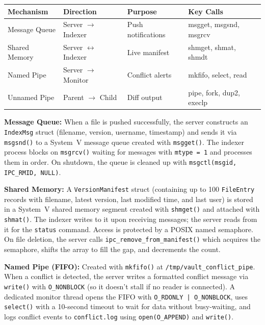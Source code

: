 \documentclass[12pt,a4paper]{article}
\begin{document}
\begin{table}[H]
\centering
\begin{tabular}{@{}llll@{}}
\toprule
\textbf{Mechanism} & \textbf{Direction} & \textbf{Purpose} & \textbf{Key Calls} \\
\midrule
Message Queue  & Server $\to$ Indexer & Push notifications & msgget, msgsnd, msgrcv \\[0.2em]
Shared Memory  & Server $\leftrightarrow$ Indexer & Live manifest & shmget, shmat, shmdt \\[0.2em]
Named Pipe     & Server $\to$ Monitor & Conflict alerts   & mkfifo, select, read \\[0.2em]
Unnamed Pipe   & Parent $\to$ Child   & Diff output       & pipe, fork, dup2, execlp \\
\bottomrule
\end{tabular}
\end{table}

\textbf{Message Queue:} When a file is pushed successfully, the server constructs
an \texttt{IndexMsg} struct (filename, version, username, timestamp) and sends it
via \texttt{msgsnd()} to a System~V message queue created with \texttt{msgget()}.
The indexer process blocks on \texttt{msgrcv()} waiting for messages with
\texttt{mtype = 1} and processes them in order. On shutdown, the queue is cleaned
up with \texttt{msgctl(msgid, IPC\_RMID, NULL)}.

\textbf{Shared Memory:} A \texttt{VersionManifest} struct (containing up to 100
\texttt{FileEntry} records with filename, latest version, last modified time, and
last user) is stored in a System~V shared memory segment created with
\texttt{shmget()} and attached with \texttt{shmat()}. The indexer writes to it
upon receiving messages; the server reads from it for the \texttt{status} command.
Access is protected by a POSIX named semaphore. On file deletion, the server calls
\texttt{ipc\_remove\_from\_manifest()} which acquires the semaphore, shifts the
array to fill the gap, and decrements the count.

\textbf{Named Pipe (FIFO):} Created with \texttt{mkfifo()} at
\texttt{/tmp/vault\_conflict\_pipe}. When a conflict is detected, the server writes
a formatted conflict message via \texttt{write()} with \texttt{O\_NONBLOCK} (so it
doesn't stall if no reader is connected). A dedicated monitor thread opens the FIFO
with \texttt{O\_RDONLY | O\_NONBLOCK}, uses \texttt{select()} with a 10-second
timeout to wait for data without busy-waiting, and logs conflict events to
\texttt{conflict.log} using \texttt{open(O\_APPEND)} and \texttt{write()}.
\end{document}
